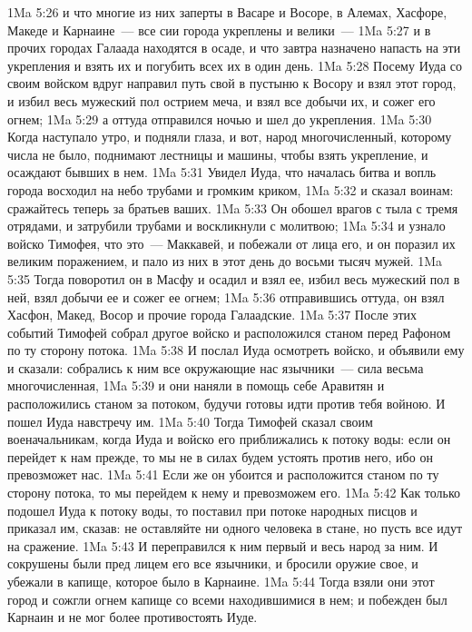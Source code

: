 \vs 1Ma 5:26 и что многие из них заперты в Васаре и Восоре, в Алемах, Хасфоре, Македе и Карнаине~--- все сии города укреплены и велики~---
\vs 1Ma 5:27 и в прочих городах Галаада находятся в осаде, и что завтра назначено напасть на эти укрепления и взять их и погубить всех их в один день.
\vs 1Ma 5:28 Посему Иуда со своим войском вдруг направил путь свой в пустыню к Восору и взял этот город, и избил весь мужеский пол острием меча, и взял все добычи их, и сожег его огнем;
\vs 1Ma 5:29 а оттуда отправился ночью и шел до укрепления.
\vs 1Ma 5:30 Когда наступало утро, и подняли глаза, и вот, народ многочисленный, которому числа не было, поднимают лестницы и машины, чтобы взять укрепление, и осаждают бывших в нем.
\vs 1Ma 5:31 Увидел Иуда, что началась битва и вопль города восходил на небо трубами и громким криком,
\vs 1Ma 5:32 и сказал воинам: сражайтесь теперь за братьев ваших.
\vs 1Ma 5:33 Он обошел врагов с тыла с тремя отрядами, и затрубили трубами и воскликнули с молитвою;
\vs 1Ma 5:34 и узнало войско Тимофея, что это~--- Маккавей, и побежали от лица его, и он поразил их великим поражением, и пало из них в этот день до восьми тысяч мужей.
\vs 1Ma 5:35 Тогда поворотил он в Масфу и осадил и взял ее, избил весь мужеский пол в ней, взял добычи ее и сожег ее огнем;
\vs 1Ma 5:36 отправившись оттуда, он взял Хасфон, Макед, Восор и прочие города Галаадские.
\rsbpar\vs 1Ma 5:37 После этих событий Тимофей собрал другое войско и расположился станом перед Рафоном по ту сторону потока.
\vs 1Ma 5:38 И послал Иуда осмотреть войско, и объявили ему и сказали: собрались к ним все окружающие нас язычники~--- сила весьма многочисленная,
\vs 1Ma 5:39 и они наняли в помощь себе Аравитян и расположились станом за потоком, будучи готовы идти против тебя войною. И пошел Иуда навстречу им.
\vs 1Ma 5:40 Тогда Тимофей сказал своим военачальникам, когда Иуда и войско его приближались к потоку воды: если он перейдет к нам прежде, то мы не в силах будем устоять против него, ибо он превозможет нас.
\vs 1Ma 5:41 Если же он убоится и расположится станом по ту сторону потока, то мы перейдем к нему и превозможем его.
\vs 1Ma 5:42 Как только подошел Иуда к потоку воды, то поставил при потоке народных писцов и приказал им, сказав: не оставляйте ни одного человека в стане, но пусть все идут на сражение.
\vs 1Ma 5:43 И переправился к ним первый и весь народ за ним. И сокрушены были пред лицем его все язычники, и бросили оружие свое, и убежали в капище, которое было в Карнаине.
\vs 1Ma 5:44 Тогда взяли они этот город и сожгли огнем капище со всеми находившимися в нем; и побежден был Карнаин и не мог более противостоять Иуде.

